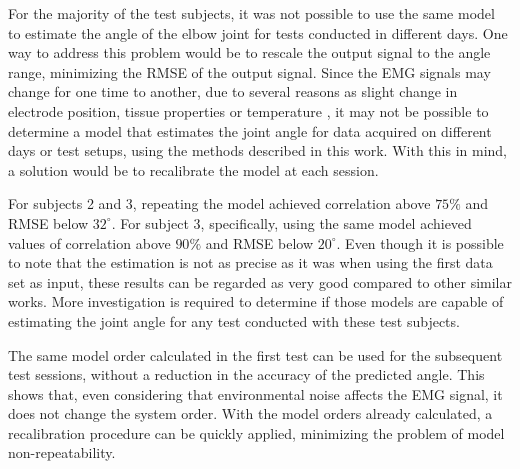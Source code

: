 \documentclass[letterpaper, 10 pt, conference]{ieeeconf}  %
\begin{document}

For the majority of the test subjects, it was not possible to use the same model to estimate the angle of the elbow joint for tests conducted in different days. One way to address this problem would be to rescale the output signal to the angle range, minimizing the RMSE of the output signal. Since the EMG signals may change for one time to another, due to several reasons as slight change in electrode position, tissue properties or temperature \cite{soderberg1975}, it may not be possible to determine a model that estimates the joint angle for data acquired on different days or test setups, using the methods described in this work. With this in mind, a solution would be to recalibrate the model at each session.

\addtolength{\textheight}{-4.5cm} %

For subjects 2 and 3, repeating the model achieved correlation above $75\%$ and RMSE below $32^\circ$. For subject 3, specifically, using the same model achieved values of correlation above $90\%$ and RMSE below $20^\circ$. Even though it is possible to note that the estimation is not as precise as it was when using the first data set as input, these results can be regarded as very good compared to other similar works. More investigation is required to determine if those models are capable of estimating the joint angle for any test conducted with these test subjects.
% 
% 

% 
% 

The same model order calculated in the first test can be used for the subsequent test sessions, without a reduction in the accuracy of the predicted angle. This shows that, even considering that environmental noise affects the EMG signal, it does not change the system order. With the model orders already calculated, a recalibration procedure can be quickly applied, minimizing the problem of model non-repeatability.
\end{document}
